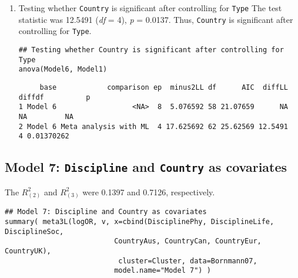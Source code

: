 \documentclass[11pt]{article}
\begin{document}
\begin{enumerate}
\item Testing whether \texttt{Country} is significant after controlling for \texttt{Type}
\label{sec:org662cf11}
The test statistic was 12.5491 (\emph{df} = 4), \emph{p} = 0.0137. Thus, \texttt{Country} is significant after controlling for \texttt{Type}.
\begin{verbatim}
## Testing whether Country is significant after controlling for Type
anova(Model6, Model1)
\end{verbatim}

\begin{verbatim}
     base            comparison ep  minus2LL df      AIC  diffLL diffdf          p
1 Model 6                  <NA>  8  5.076592 58 21.07659      NA     NA         NA
2 Model 6 Meta analysis with ML  4 17.625692 62 25.62569 12.5491      4 0.01370262
\end{verbatim}
\end{enumerate}

\subsection{Model 7: \texttt{Discipline} and \texttt{Country} as covariates}
\label{sec:org78287ee}
The \(R^2_{(2)}\) and \(R^2_{(3)}\) were 0.1397 and 0.7126, respectively.

\begin{verbatim}
## Model 7: Discipline and Country as covariates
summary( meta3L(logOR, v, x=cbind(DisciplinePhy, DisciplineLife, DisciplineSoc,
                          CountryAus, CountryCan, CountryEur, CountryUK), 
                           cluster=Cluster, data=Bornmann07,
                          model.name="Model 7") )
\end{verbatim}
\end{document}
